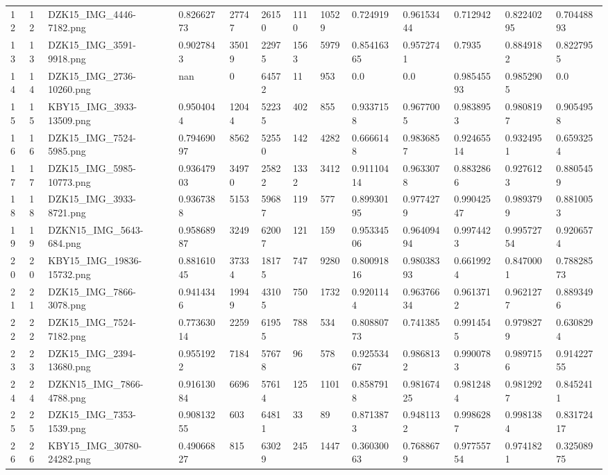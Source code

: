 \documentclass[11pt, a4paper, twoside]{report}
\begin{document}
\begin{longtable}[c]{@{}lllllllllllll@{}}
12 & 12 & DZK15\_IMG\_4446-7182.png & 0.82662773 & 27747 & 26150 & 1110 & 10529 & 0.724919 & 0.96153444 & 0.712942 & 0.82240295 & 0.70448893 \\
13 & 13 & DZK15\_IMG\_3591-9918.png & 0.9027843 & 35019 & 22975 & 1563 & 5979 & 0.85416365 & 0.9572741 & 0.7935 & 0.8849182 & 0.8227955 \\
14 & 14 & DZK15\_IMG\_2736-10260.png & nan & 0 & 64572 & 11 & 953 & 0.0 & 0.0 & 0.98545593 & 0.9852905 & 0.0 \\
15 & 15 & KBY15\_IMG\_3933-13509.png & 0.9504044 & 12044 & 52235 & 402 & 855 & 0.9337158 & 0.9677005 & 0.9838953 & 0.9808197 & 0.9054958 \\
16 & 16 & DZK15\_IMG\_7524-5985.png & 0.79469097 & 8562 & 52550 & 142 & 4282 & 0.6666148 & 0.9836857 & 0.92465514 & 0.9324951 & 0.6593254 \\
17 & 17 & DZK15\_IMG\_5985-10773.png & 0.93647903 & 34970 & 25822 & 1332 & 3412 & 0.91110414 & 0.9633078 & 0.8832866 & 0.9276123 & 0.8805459 \\
18 & 18 & DZK15\_IMG\_3933-8721.png & 0.9367388 & 5153 & 59687 & 119 & 577 & 0.89930195 & 0.9774279 & 0.99042547 & 0.9893799 & 0.8810053 \\
19 & 19 & DZKN15\_IMG\_5643-684.png & 0.95868987 & 3249 & 62007 & 121 & 159 & 0.95334506 & 0.96409494 & 0.9974423 & 0.99572754 & 0.9206574 \\
20 & 20 & KBY15\_IMG\_19836-15732.png & 0.88161045 & 37334 & 18175 & 747 & 9280 & 0.80091816 & 0.98038393 & 0.6619924 & 0.8470001 & 0.78828573 \\
21 & 21 & DZK15\_IMG\_7866-3078.png & 0.9414346 & 19949 & 43105 & 750 & 1732 & 0.9201144 & 0.96376634 & 0.9613712 & 0.9621277 & 0.8893496 \\
22 & 22 & DZK15\_IMG\_7524-7182.png & 0.77363014 & 2259 & 61955 & 788 & 534 & 0.80880773 & 0.741385 & 0.9914545 & 0.9798279 & 0.6308294 \\
23 & 23 & DZK15\_IMG\_2394-13680.png & 0.9551922 & 7184 & 57678 & 96 & 578 & 0.92553467 & 0.9868132 & 0.9900783 & 0.9897156 & 0.91422755 \\
24 & 24 & DZKN15\_IMG\_7866-4788.png & 0.91613084 & 6696 & 57614 & 125 & 1101 & 0.8587918 & 0.98167425 & 0.9812484 & 0.9812927 & 0.8452411 \\
25 & 25 & DZK15\_IMG\_7353-1539.png & 0.90813255 & 603 & 64811 & 33 & 89 & 0.8713873 & 0.9481132 & 0.9986287 & 0.9981384 & 0.83172417 \\
26 & 26 & KBY15\_IMG\_30780-24282.png & 0.49066827 & 815 & 63029 & 245 & 1447 & 0.36030063 & 0.7688679 & 0.97755754 & 0.9741821 & 0.32508975 \\

\end{longtable}
\end{document}
